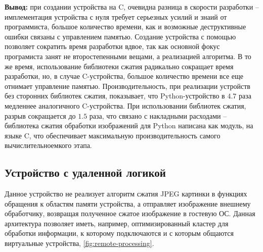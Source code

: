 \textbf{Вывод:} при создании устройства на C, очевидна разница
в скорости разработки -- имплементация устройства с нуля
требует серьезных усилий и знаий от программиста, большое количество
времени, как и возможные деструктивные ошибки связаны с управлением
памятью. Создание устройства с помощью {\mylanguage} позволяет
сократить время разработки вдвое, так как основной фокус програмиста
занят не второстепенными вещами, а реализацией алгоритма.
В то же время, использование библиотеки сжатия радикально сокращает
время разработки, но, в случае C-устройства, большое количество
времени все еще отнимает управление памятью.
Производительность, при реализации устройств без сторонних
библиотек сжатия, показывает, что Python-устройство в $4.7$ раза
медленнее аналогичного C-устройства. При использовании
библиотек сжатия, разрыв сокращается до $1.5$ раза, что связано
с накладными расходами -- библиотека сжатия обработки изображений
для Python написана как модуль, на языке C, что обеспечивает
максимальную производительность самого вычислительноемкого этапа.

\subsection{Устройство с удаленной логикой}\label{sec:ch3/sec2/sec2}

Данное устройство не реализует алгоритм сжатия JPEG картинки в функциях обращения
к областям памяти устройства, а отправляет изображение внешнему обработчику,
возвращая полученное сжатое изображение в гостевую ОС.
Данная архитектура позволяет иметь, например, оптимизированный
кластер для обработки информации, к которому подключаются и с
которым общаются виртуальные устройства, \cref{fig:remote-processing}.

